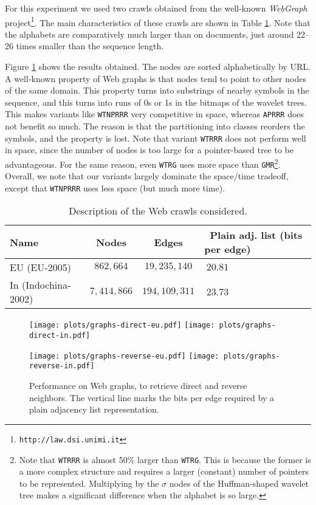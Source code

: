 \documentclass[11pt]{article}
\begin{document}
For this experiment we used two crawls obtained from the well-known 
{\em WebGraph} project\footnote{{\tt http://law.dsi.unimi.it}}.
The main characteristics of these crawls are shown in Table \ref{tab:crawls}. 
Note that the alphabets are comparatively much larger than on documents,
just around 22--26 times smaller than the sequence length.

Figure \ref{fig:graphs} shows the results obtained. The nodes are sorted
alphabetically by URL. A well-known property of Web graphs \cite{BV04} is that 
nodes tend to point to other nodes of the same domain. This property turns into
substrings of nearby symbols in the sequence, and this turns into runs of
0s or 1s in the bitmaps of the wavelet trees. This makes variants like
\texttt{WTNPRRR} very competitive in space, whereas \texttt{APRRR} does not
benefit so much. The reason is that the partitioning into
classes reorders the symbols, and the property is lost. Note that variant
{\tt WTRRR} does not perform well in space, since the number of nodes is too
large for a pointer-based tree to be advantageous. For the same reason, even
{\tt WTRG} uses more space than {\tt GMR}\footnote{Note that \texttt{WTRRR} is
almost 50\% larger than \texttt{WTRG}. This is because the former is a more
complex structure and requires a larger (constant) number of pointers to be
represented. Multiplying by the $\sigma$ nodes of the Huffman-shaped wavelet
tree makes a significant difference when the alphabet is so large.}.
Overall, we note that our variants largely dominate the space/time tradeoff,
except that \texttt{WTNPRRR} uses less space (but much more time).

\begin{table}
\begin{center}
\begin{tabular}{l|c|c|l}
{ Name} & {Nodes } & {Edges } & ~Plain adj. list (bits per edge)\\
\hline
EU (EU-2005) & $862{,}664$ & $19{,}235{,}140$ & $~20.81$ \\
In (Indochina-2002) & $7{,}414{,}866$ & $194{,}109{,}311$ & $~23.73$ \\
\end{tabular}
\caption{Description of the Web crawls considered.}
\label{tab:crawls}
\end{center}
\end{table}

\begin{figure}[tb]
\centerline{\texttt{[image: plots/graphs-direct-eu.pdf]}
\texttt{[image: plots/graphs-direct-in.pdf]}}

\centerline{\texttt{[image: plots/graphs-reverse-eu.pdf]}
\texttt{[image: plots/graphs-reverse-in.pdf]}}
\caption{Performance on Web graphs, to retrieve direct and reverse neighbors. The vertical line marks the bits per edge required by a plain adjacency list representation.}
\label{fig:graphs}
\end{figure}
\end{document}
